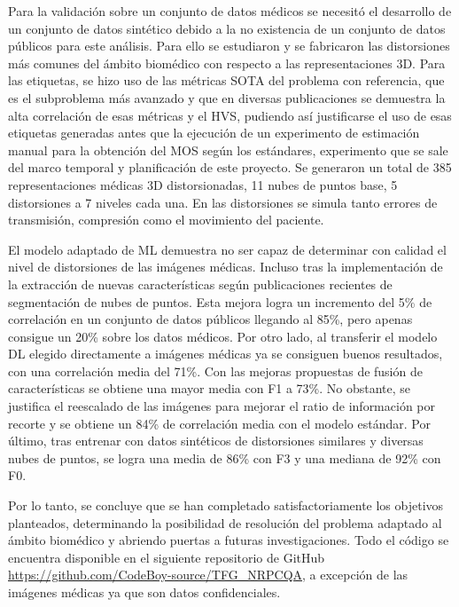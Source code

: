Para la validación sobre un conjunto de datos médicos se necesitó el desarrollo 
de un conjunto de datos sintético debido a la no existencia de un conjunto de 
datos públicos para este análisis. Para ello se estudiaron y se fabricaron las distorsiones más 
comunes del ámbito biomédico con respecto a las representaciones 3D. Para las etiquetas, 
se hizo uso de las métricas SOTA del problema con referencia, que es el subproblema 
más avanzado y que en diversas publicaciones se demuestra la alta correlación 
de esas métricas y el HVS, pudiendo así justificarse el uso de esas 
etiquetas generadas antes que la ejecución de un experimento de estimación 
manual para la obtención del MOS según los estándares, experimento que se 
sale del marco temporal y planificación de este proyecto. Se generaron 
un total de 385 representaciones médicas 3D distorsionadas, 11 nubes de puntos 
base, 5 distorsiones a 7 niveles cada una. En las distorsiones se simula 
tanto errores de transmisión, compresión como el movimiento del paciente.

El modelo adaptado de ML demuestra no ser capaz de determinar con calidad 
el nivel de distorsiones de las imágenes médicas. Incluso tras la implementación 
de la extracción de nuevas características según publicaciones recientes 
de segmentación de nubes de puntos. Esta mejora logra un incremento del 5\% de correlación en un conjunto de datos públicos llegando al 85\%, pero apenas consigue un 20\% sobre los datos médicos. 
Por otro lado, al transferir el modelo DL elegido directamente a imágenes médicas ya se consiguen 
buenos resultados, con una correlación media del 71\%. Con las mejoras propuestas de 
fusión de características se obtiene una mayor media con F1 a 73\%. No obstante, 
se justifica el reescalado de las imágenes para mejorar el ratio de información 
por recorte y se obtiene un 84\% de correlación media con el modelo estándar. 
Por último, tras entrenar con datos sintéticos de distorsiones similares y 
diversas nubes de puntos, se logra una media de 86\% con F3 y una mediana de 92\% con F0.

Por lo tanto, se concluye que se han completado satisfactoriamente los objetivos 
planteados, determinando la posibilidad de resolución del problema adaptado 
al ámbito biomédico y abriendo puertas a futuras investigaciones. Todo el código
se encuentra disponible en el siguiente repositorio de GitHub \url{https://github.com/CodeBoy-source/TFG_NRPCQA},
a excepción de las imágenes médicas ya que son datos confidenciales.

